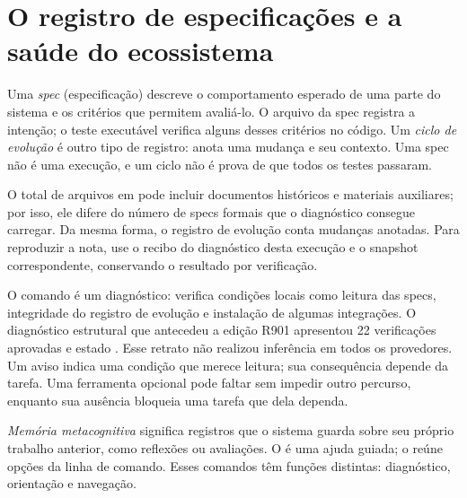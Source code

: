 \clearpage
\section{O registro de especificações e a saúde do ecossistema}


\begin{resultado}
Uma \emph{spec} (especificação) descreve o comportamento esperado de uma parte do
sistema e os critérios que permitem avaliá-lo. O arquivo da spec registra a
intenção; o teste executável verifica alguns desses critérios no código. Um
\emph{ciclo de evolução} é outro tipo de registro: anota uma mudança e seu
contexto. Uma spec não é uma execução, e um ciclo não é prova de que todos os
testes passaram.

O total de arquivos em  pode incluir documentos históricos e
materiais auxiliares; por isso, ele difere do número de specs formais que o
diagnóstico consegue carregar. Da mesma forma, o registro de evolução conta
mudanças anotadas. Para reproduzir a nota, use o recibo do diagnóstico desta
execução e o snapshot correspondente, conservando o resultado por verificação.
\end{resultado}

\begin{funcao}
O comando  é um diagnóstico: verifica
condições locais como leitura das specs, integridade do registro de evolução e
instalação de algumas integrações. O diagnóstico estrutural que antecedeu a
edição R901 apresentou 22 verificações aprovadas e estado .
Esse retrato não realizou inferência em todos os provedores. Um aviso indica
uma condição que merece leitura; sua consequência depende da tarefa. Uma
ferramenta opcional pode faltar sem impedir outro percurso, enquanto sua ausência
bloqueia uma tarefa que dela dependa.

\emph{Memória metacognitiva} significa registros que o sistema guarda sobre seu
próprio trabalho anterior, como reflexões ou avaliações. O  é uma
ajuda guiada; o  reúne opções da linha de comando. Esses comandos têm
funções distintas: diagnóstico, orientação e navegação.
\end{funcao}

